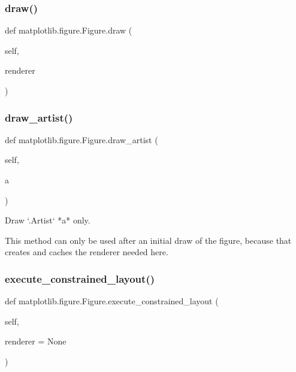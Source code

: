 \subsubsection{\texorpdfstring{draw()}{draw()}}
{\footnotesize\ttfamily def matplotlib.\+figure.\+Figure.\+draw (\begin{DoxyParamCaption}\item[{}]{self,  }\item[{}]{renderer }\end{DoxyParamCaption})}

\mbox{\label{classmatplotlib_1_1figure_1_1Figure_acbb6d104c4c35cd60d29a44a343a0ea2}} 
\subsubsection{\texorpdfstring{draw\+\_\+artist()}{draw\_artist()}}
{\footnotesize\ttfamily def matplotlib.\+figure.\+Figure.\+draw\+\_\+artist (\begin{DoxyParamCaption}\item[{}]{self,  }\item[{}]{a }\end{DoxyParamCaption})}

\begin{DoxyVerb}Draw `.Artist` *a* only.

This method can only be used after an initial draw of the figure,
because that creates and caches the renderer needed here.
\end{DoxyVerb}
 \mbox{\label{classmatplotlib_1_1figure_1_1Figure_ab7f2a1534708b2e025b628a33244d162}} 
\subsubsection{\texorpdfstring{execute\+\_\+constrained\+\_\+layout()}{execute\_constrained\_layout()}}
{\footnotesize\ttfamily def matplotlib.\+figure.\+Figure.\+execute\+\_\+constrained\+\_\+layout (\begin{DoxyParamCaption}\item[{}]{self,  }\item[{}]{renderer = {\ttfamily None} }\end{DoxyParamCaption})}

